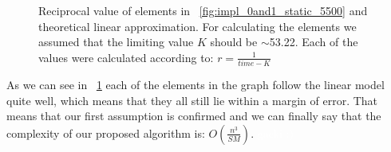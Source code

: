 \documentclass[draft, final]{vutinfth} %
\begin{document}
				\begin{figure}[!ht]
					\centering
					\caption{Reciprocal value of elements in ~\ref{fig:impl_0and1_static_5500} and theoretical linear approximation. For calculating the elements we assumed that the limiting value $K$ should be $\sim$53.22. Each of the values were calculated according to: $r = \frac{1}{time-K}$}
					\label{fig:reciprocal}
				\end{figure}

				As we can see in ~\ref{fig:reciprocal} each of the elements in the graph follow the linear model quite well, which means that they all still lie within a margin of error. That means that our first assumption is confirmed and we can finally say that the complexity of our proposed algorithm is: $O(\frac{n^3}{SM})$. \textcolor{white}{gacki ;)}



				
\end{document}
